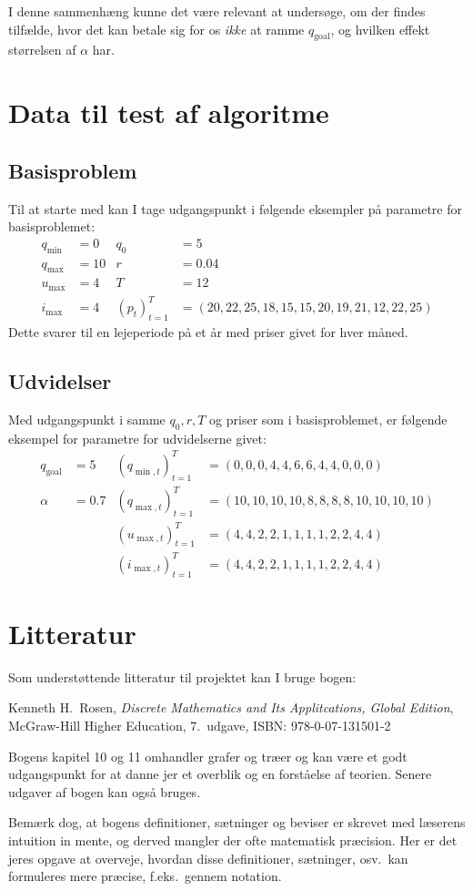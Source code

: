 \documentclass[12pt,a4paper,oneside,final]{article}
\begin{document}
I denne sammenhæng kunne det være relevant at undersøge, om der findes tilfælde, hvor det kan betale sig for os \emph{ikke} at ramme \(q_{\mathrm{goal}}\), og hvilken effekt størrelsen af \(\alpha\) har.


\clearpage
\section{Data til test af algoritme}

\subsection{Basisproblem}
Til at starte med kan I tage udgangspunkt i følgende eksempler på parametre for basisproblemet:
\begin{align*}
  q_{\min} &= 0 & q_{0} &= 5 \\
  q_{\max} &= 10 & r &= 0.04 \\
  u_{\max} &= 4 &  T &= 12 \\
  i_{\max} &= 4 &  (p_{t})_{t=1}^{T} &= (20, 22, 25, 18, 15, 15, 20, 19, 21, 12, 22, 25)
\end{align*}
Dette svarer til en lejeperiode på et år med priser givet for hver måned.

\subsection{Udvidelser}
Med udgangspunkt i samme \(q_{0}, r, T\) og priser som i basisproblemet, er følgende eksempel for parametre for udvidelserne givet:
\begin{align*}
  q_{\mathrm{goal}} & = 5   & (q_{\min,t})_{t=1}^{T} & = (0, 0, 0, 4, 4, 6, 6, 4, 4, 0, 0, 0)          \\
  \alpha            & = 0.7 & (q_{\max,t})_{t=1}^{T} & = (10, 10, 10, 10, 8, 8, 8, 8, 10, 10, 10, 10)  \\
                    &       & (u_{\max,t})_{t=1}^{T} & = (4, 4, 2, 2, 1, 1, 1, 1, 2, 2, 4, 4)          \\
                    &       & (i_{\max,t})_{t=1}^{T} & = (4, 4, 2, 2, 1, 1, 1, 1, 2, 2, 4, 4)
\end{align*}


\section{Litteratur}
Som understøttende litteratur til projektet kan I bruge bogen:
\begin{center}
  Kenneth H.\ Rosen,
  \emph{Discrete Mathematics and Its Applitcations, Global Edition},\\
  McGraw-Hill Higher Education,
  7.\ udgave,
  ISBN: 978-0-07-131501-2
\end{center}
Bogens kapitel 10 og 11 omhandler grafer og træer og kan være et godt udgangspunkt for at danne jer et overblik og en forståelse af teorien.
Senere udgaver af bogen kan også bruges.

Bemærk dog, at bogens definitioner, sætninger og beviser er skrevet med læserens intuition in mente, og derved mangler der ofte  matematisk præcision.
Her er det jeres opgave at overveje, hvordan disse definitioner, sætninger, osv.\ kan formuleres mere præcise, f.eks.\ gennem notation.
\end{document}
